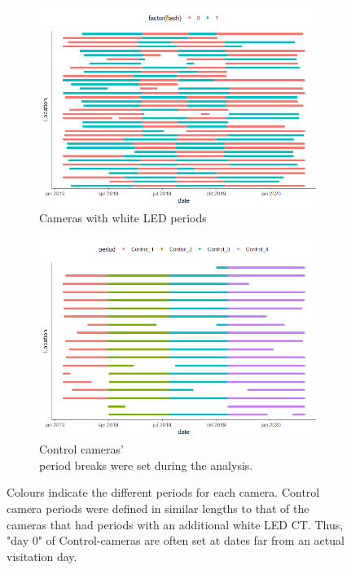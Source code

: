 \begin{figure}
	\begin{subfigure}{1\textwidth}
		\centering
		\includegraphics[scale=.8]{../R/FLM_notebook_files/figure-gfm/effort-facet-1.png}
			\caption{\label{fig:timeseries_flash} Cameras with white LED periods}	
	\end{subfigure}	
	\begin{subfigure}{1\textwidth}
		\centering
		\includegraphics[scale=.8]{../R/FLM_notebook_files/figure-gfm/effort-facet-2.png}
			\caption{\label{fig:timeseries_control} Control cameras'\\ period breaks were set during the analysis.}	
	\end{subfigure}	
\caption[Active camera days]
{Colours indicate the different periods for each camera. Control camera periods were defined in similar lengths to that of the cameras that had periods with an additional white LED CT. Thus, "day 0" of Control-cameras are often set at dates far from an actual visitation day. \label{fig:timeseries_figure}}
\end{figure}
